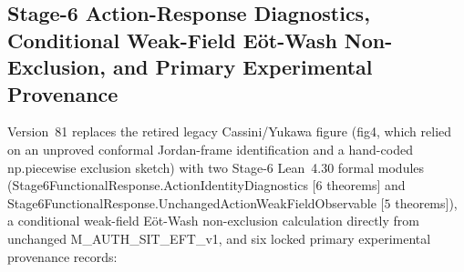 \documentclass[american,11pt,letterpaper]{article}
\def\texttt#1{#1}%
\begin{document}
\subsection{Stage-6 Action-Response Diagnostics, Conditional Weak-Field E\"ot-Wash Non-Exclusion, and Primary Experimental Provenance}
\label{sec:stage6-action-diagnostics}

Version~81 replaces the retired legacy Cassini/Yukawa figure (\texttt{fig4}, which relied on an unproved conformal Jordan-frame identification and a hand-coded \texttt{np.piecewise} exclusion sketch) with two Stage-6 Lean~4.30 formal modules (\texttt{Stage6FunctionalResponse.\allowbreak{}ActionIdentityDiagnostics} [$6$ theorems] and \texttt{Stage6FunctionalResponse.\allowbreak{}UnchangedActionWeakFieldObservable} [$5$ theorems]), a conditional weak-field E\"ot-Wash non-exclusion calculation directly from unchanged \texttt{M\_AUTH\_SIT\_EFT\_v1}, and six locked primary experimental provenance records:
\end{document}
